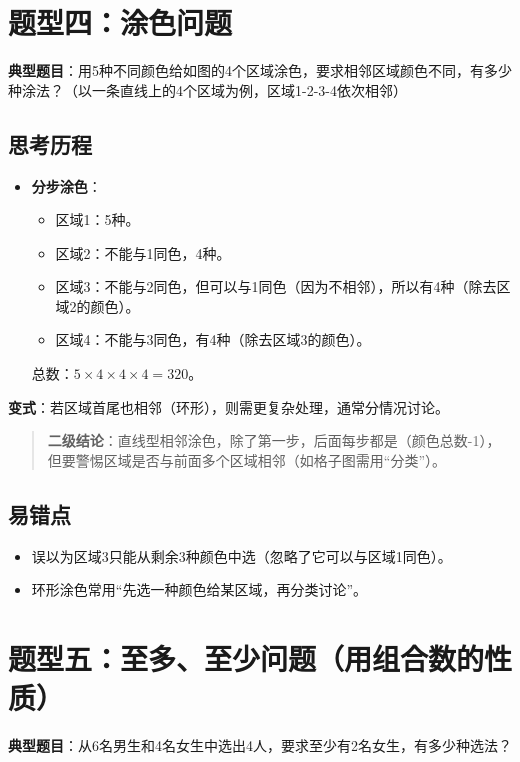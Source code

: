\documentclass[10pt]{article}
\begin{document}
\section{题型四：涂色问题}

\textbf{典型题目}：用5种不同颜色给如图的4个区域涂色，要求相邻区域颜色不同，有多少种涂法？（以一条直线上的4个区域为例，区域1-2-3-4依次相邻）

\subsection*{思考历程}
\begin{itemize}
\item \textbf{分步涂色}：
\begin{itemize}
\item 区域1：5种。
\item 区域2：不能与1同色，4种。
\item 区域3：不能与2同色，但可以与1同色（因为不相邻），所以有4种（除去区域2的颜色）。
\item 区域4：不能与3同色，有4种（除去区域3的颜色）。
\end{itemize}
总数：\(5 \times 4 \times 4 \times 4 = 320\)。
\end{itemize}

\textbf{变式}：若区域首尾也相邻（环形），则需更复杂处理，通常分情况讨论。

\begin{quote}
\textbf{二级结论}：直线型相邻涂色，除了第一步，后面每步都是（颜色总数-1），但要警惕区域是否与前面多个区域相邻（如格子图需用“分类”）。
\end{quote}

\subsection*{易错点}
\begin{itemize}
\item 误以为区域3只能从剩余3种颜色中选（忽略了它可以与区域1同色）。
\item 环形涂色常用“先选一种颜色给某区域，再分类讨论”。
\end{itemize}

\section{题型五：至多、至少问题（用组合数的性质）}

\textbf{典型题目}：从6名男生和4名女生中选出4人，要求至少有2名女生，有多少种选法？
\end{document}
